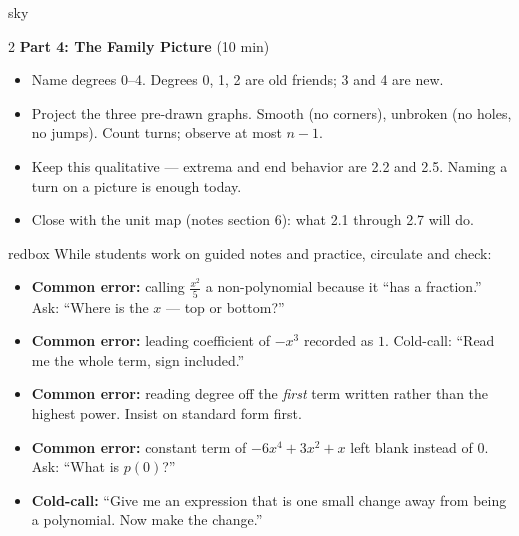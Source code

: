\documentclass[10pt]{article}
\begin{document}
\begin{skillbox}[Lesson]{sky}
\begin{multicols}{2}
\textbf{Part 4: The Family Picture} (10 min)

\begin{itemize}
  \item Name degrees 0--4. Degrees 0, 1, 2 are old friends; 3 and 4 are new.
  \item Project the three pre-drawn graphs. Smooth (no corners), unbroken (no
        holes, no jumps). Count turns; observe at most $n-1$.
  \item Keep this qualitative --- extrema and end behavior are 2.2 and 2.5. Naming
        a turn on a picture is enough today.
  \item Close with the unit map (notes section 6): what 2.1 through 2.7 will do.
\end{itemize}
\end{multicols}
\end{skillbox}

\begin{skillbox}{redbox}
While students work on guided notes and practice, circulate and check:
\begin{itemize}
  \item \textbf{Common error:} calling $\frac{x^2}{5}$ a non-polynomial because it
        ``has a fraction.'' Ask: ``Where is the $x$ --- top or bottom?''
  \item \textbf{Common error:} leading coefficient of $-x^3$ recorded as $1$.
        Cold-call: ``Read me the whole term, sign included.''
  \item \textbf{Common error:} reading degree off the \textit{first} term written
        rather than the highest power. Insist on standard form first.
  \item \textbf{Common error:} constant term of $-6x^4 + 3x^2 + x$ left blank
        instead of $0$. Ask: ``What is $p(0)$?''
  \item \textbf{Cold-call:} ``Give me an expression that is one small change away
        from being a polynomial. Now make the change.''
\end{itemize}
\end{skillbox}
\end{document}
